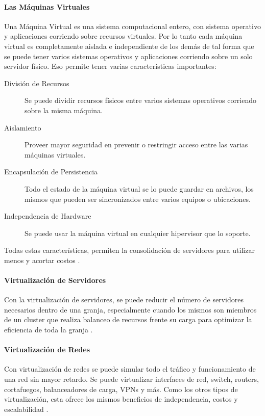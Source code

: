 \paragraph{Las Máquinas Virtuales}
Una Máquina Virtual es una sistema computacional entero, con sistema operativo y aplicaciones corriendo sobre recursos virtuales. Por lo tanto cada máquina virtual es completamente aislada e independiente de los demás de tal forma que se puede tener varios sistemas operativos y aplicaciones corriendo sobre un solo servidor físico. Eso permite tener varias características importantes:
\begin{description}
	\item[División de Recursos] Se puede dividir recursos físicos entre varios sistemas operativos corriendo sobre la misma máquina.
    \item[Aislamiento] Proveer mayor seguridad en prevenir o restringir acceso entre las varias máquinas virtuales.
    \item[Encapsulación de Persistencia] Todo el estado de la máquina virtual se lo puede guardar en archivos, los mismos que pueden ser sincronizados entre varios equipos o ubicaciones.
    \item[Independencia de Hardware] Se puede usar la máquina virtual en cualquier hipervisor que lo soporte.
\end{description}
Todas estas características, permiten la consolidación de servidores para utilizar menos y acortar costos \citep{VMWare-Virtualization}.

\paragraph{Virtualización de Servidores}
Con la virtualización de servidores, se puede reducir el número de servidores necesarios dentro de una granja, especialmente cuando los mismos son miembros de un cluster que realiza balanceo de recursos frente su carga para optimizar la eficiencia de toda la granja \citep{VMWare-Virtualization}.

\paragraph{Virtualización de Redes}
Con virtualización de redes se puede simular todo el tráfico y funcionamiento de una red sin mayor retardo. Se puede virtualizar interfaces de red, switch, routers, cortafuegos, balanceadores de carga, VPNs y más. Como los otros tipos de virtualización, esta ofrece los mismos beneficios de independencia, costos y escalabilidad \citep{VMWare-Virtualization}.

